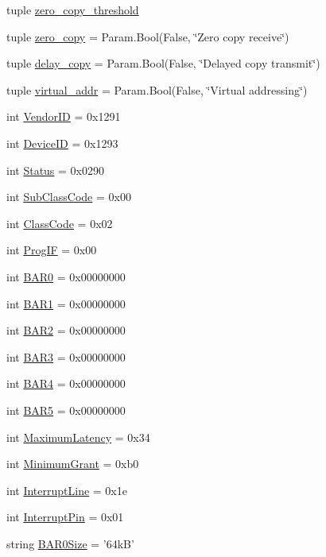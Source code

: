 \begin{DoxyCompactItemize}
\item 
tuple \hyperlink{classEthernet_1_1Sinic_a8203956e7fb7375ad748c7749fd79643}{zero\_\-copy\_\-threshold}
\item 
tuple \hyperlink{classEthernet_1_1Sinic_ad152ba2857f68b25cd512c0f19295d92}{zero\_\-copy} = Param.Bool(False, \char`\"{}Zero copy receive\char`\"{})
\item 
tuple \hyperlink{classEthernet_1_1Sinic_a8347994076e01ff1f8ded0b2195c978d}{delay\_\-copy} = Param.Bool(False, \char`\"{}Delayed copy transmit\char`\"{})
\item 
tuple \hyperlink{classEthernet_1_1Sinic_afb2bd0aeeb0bff46f8f6882df3d38041}{virtual\_\-addr} = Param.Bool(False, \char`\"{}Virtual addressing\char`\"{})
\item 
int \hyperlink{classEthernet_1_1Sinic_a96ec1b4422f12f72160a0633ada47217}{VendorID} = 0x1291
\item 
int \hyperlink{classEthernet_1_1Sinic_a4a8ed9a0233fc6d0ce178569c4de25d0}{DeviceID} = 0x1293
\item 
int \hyperlink{classEthernet_1_1Sinic_ae58c2415cf1178457fa1254234c3f017}{Status} = 0x0290
\item 
int \hyperlink{classEthernet_1_1Sinic_a6537e94b8ab06acd357673ec1699adc8}{SubClassCode} = 0x00
\item 
int \hyperlink{classEthernet_1_1Sinic_a7d0125d1930fad943a6a7471da0317ad}{ClassCode} = 0x02
\item 
int \hyperlink{classEthernet_1_1Sinic_aa63e82532e33e89795f472cfb7e0bb67}{ProgIF} = 0x00
\item 
int \hyperlink{classEthernet_1_1Sinic_aa4b1656989a2151c14fc1d464df6531c}{BAR0} = 0x00000000
\item 
int \hyperlink{classEthernet_1_1Sinic_a0d644194139bee13ebf45d34542c1dfa}{BAR1} = 0x00000000
\item 
int \hyperlink{classEthernet_1_1Sinic_a0a6f9c88531fa1221329ec6903976a8b}{BAR2} = 0x00000000
\item 
int \hyperlink{classEthernet_1_1Sinic_a0b8b6594cd17a42ee6f2bded401213d9}{BAR3} = 0x00000000
\item 
int \hyperlink{classEthernet_1_1Sinic_a563ca469426838df82cc266c302a0a70}{BAR4} = 0x00000000
\item 
int \hyperlink{classEthernet_1_1Sinic_af86e51daee4f9d86104270e5ed9a0890}{BAR5} = 0x00000000
\item 
int \hyperlink{classEthernet_1_1Sinic_a10460b79882894b983aca9f848f4ffaf}{MaximumLatency} = 0x34
\item 
int \hyperlink{classEthernet_1_1Sinic_a1f3ebd5623021488fb0bfa84f5aa357d}{MinimumGrant} = 0xb0
\item 
int \hyperlink{classEthernet_1_1Sinic_a4c885b3ef4f7d1a88903aabcce7a943e}{InterruptLine} = 0x1e
\item 
int \hyperlink{classEthernet_1_1Sinic_a9b18e7e4ee8e0f835496c9106eb519d5}{InterruptPin} = 0x01
\item 
string \hyperlink{classEthernet_1_1Sinic_aefc407ca01c833e5dac341709110c5e2}{BAR0Size} = '64kB'
\end{DoxyCompactItemize}


